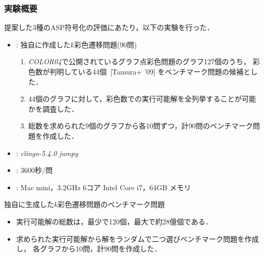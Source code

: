 \documentclass[dvipdfmx,11pt]{beamer}
\begin{document}
\begin{frame}\frametitle{実験概要}
  提案した3種のASP符号化の評価にあたり，以下の実験を行った．
  \bigskip
  \begin{itemize}
    \item {}: 独自に作成した$k$彩色遷移問題(90問)
      \begin{enumerate}
      \item \textit{COLOR04}で公開されているグラフ点彩色問題のグラフ127個のうち，
      彩色数が判明している44個~[Tamura+ '09] をベンチマーク問題の候補とした．
      \item 44個のグラフに対して，彩色数での実行可能解を全列挙することが可能
            かを調査した．
      \item 総数を求められた9個のグラフから各10問ずつ，計90問のベンチマーク問題を作成した．
      \end{enumerate}

    \item {}: \textit{clingo-5.4.0} \textit{jumpy}
    \item {}: 3600秒/問
    \item {}: Mac mini，3.2GHz 6コア Intel Core i7，64GB メモリ
  \end{itemize}
  
\end{frame}


\begin{frame}{独自に生成した$k$彩色遷移問題のベンチマーク問題}

  \begin{table}[t]
    \centering
    
  \end{table}

  \begin{itemize}
  \item 実行可能解の総数は，最少で120個，最大で約28億個である．
  \item 求められた実行可能解から解をランダムで二つ選びベンチマーク問題を作成し，
        各グラフから10問，計90問を作成した．
  \end{itemize}

\end{frame}
\end{document}
